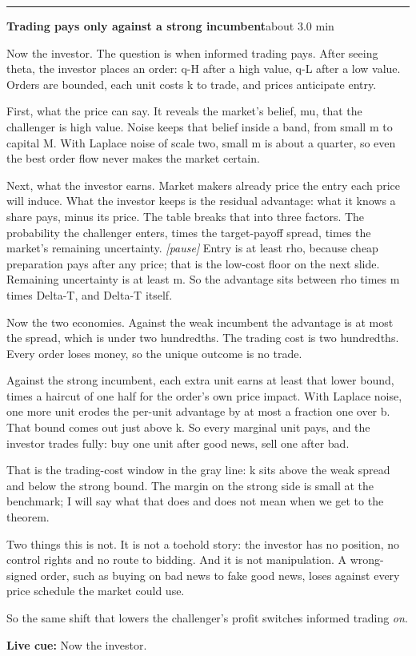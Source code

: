 \documentclass[11pt]{article}
\newcommand{\Pause}{\textcolor{ScriptGray}{\textit{[pause]}}}
\newcommand{\Cue}[1]{\par\nobreak\smallskip\noindent
  \textcolor{ScriptGray}{\footnotesize\textbf{Live cue:} #1}\par}
\newcommand{\scriptframe}[3]{%
  \Needspace{9\baselineskip}%
  \par\medskip\noindent\textcolor{ScriptBlue}{\rule{\linewidth}{0.55pt}}%
  \par\smallskip\noindent
  \textbf{#1}\hfill\textcolor{ScriptGray}{\small #2}\par\smallskip
  #3\par}
\begin{document}
\scriptframe{Trading pays only against a strong incumbent}{about 3.0 min}{%
  Now the investor. The question is when informed trading pays. After seeing
  theta, the investor places an order: q-H after a high value, q-L after a low
  value. Orders are bounded, each unit costs k to trade, and prices anticipate
  entry.

  First, what the price can say. It reveals the market's belief, mu, that the
  challenger is high value. Noise keeps that belief inside a band, from small m
  to capital M. With Laplace noise of scale two, small m is about a quarter,
  so even the best order flow never makes the market certain.

  Next, what the investor earns. Market makers already price the entry each
  price will induce. What the investor keeps is the residual advantage: what it
  knows a share pays, minus its price. The table breaks that into three
  factors. The probability the challenger enters, times the target-payoff
  spread, times the market's remaining uncertainty. \Pause{} Entry is at least
  rho, because cheap preparation pays after any price; that is the low-cost
  floor on the next slide. Remaining uncertainty is at least m. So the advantage
  sits between rho times m times Delta-T, and Delta-T itself.

  Now the two economies. Against the weak incumbent the advantage is at most the
  spread, which is under two hundredths. The trading cost is two hundredths.
  Every order loses money, so the unique outcome is no trade.

  Against the strong incumbent, each extra unit earns at least that lower bound,
  times a haircut of one half for the order's own price impact. With Laplace
  noise, one more unit erodes the per-unit advantage by at most a fraction one
  over b. That bound comes out just above k.
  So every marginal unit pays, and the investor trades fully: buy one unit after
  good news, sell one after bad.

  That is the trading-cost window in the gray line: k sits above the weak spread
  and below the strong bound. The margin on the strong side is small at the
  benchmark; I will say what that does and does not mean when we get to the
  theorem.

  Two things this is not. It is not a toehold story: the investor has no
  position, no control rights and no route to bidding. And it is not
  manipulation. A wrong-signed order, such as buying on bad news to fake good
  news, loses against every price schedule the market could use.

  So the same shift that lowers the challenger's profit switches informed
  trading \emph{on}.
  \Cue{Now the investor.}
}
\end{document}
